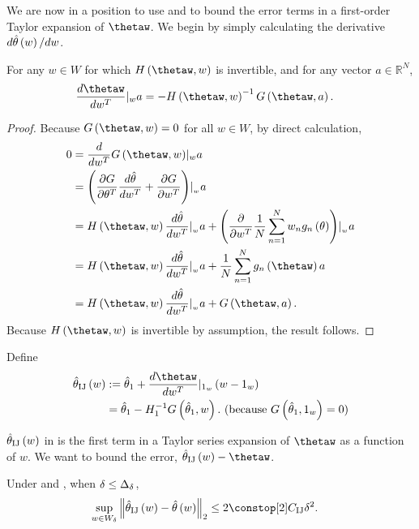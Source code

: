 We are now in a position to use \paperallcoreassum and 
to bound the error terms in a first-order Taylor expansion of $\thetaw$.
We begin by simply calculating the derivative $d\hat{\theta}\left(w\right)/dw$.
\begin{prop}
\label{propref:theta_w_first_derivative}For any $w\in W$ for which
$H\left(\thetaw,w\right)$ is invertible, and for any vector $a\in\mathbb{R}^{N}$,
\begin{align*}
\frac{d\thetaw}{dw^{T}}\at wa & =-H\left(\thetaw,w\right)^{-1}G\left(\thetaw,a\right).
\end{align*}
\end{prop}
\begin{proof}
Because $G\left(\thetaw,w\right)=0$ for all $w\in W$, by direct
calculation,
\begin{align*}
0 & =\frac{d}{dw^{T}}G\left(\thetaw,w\right)\at wa\\
 & =\left(\frac{\partial G}{\partial\theta^{T}}\frac{d\hat{\theta}}{dw^{T}}+\frac{\partial G}{\partial w^{T}}\right)\at{_{w}}a\\
 & =H\left(\thetaw,w\right)\frac{d\hat{\theta}}{dw^{T}}\at{_{w}}a+\left(\frac{\partial}{\partial w^{T}}\frac{1}{N}\sum_{n=1}^{N}w_{n}g_{n}\left(\theta\right)\right)\at{_{w}}a\\
 & =H\left(\thetaw,w\right)\frac{d\hat{\theta}}{dw^{T}}\at{_{w}}a+\frac{1}{N}\sum_{n=1}^{N}g_{n}\left(\thetaw\right)a\\
 & =H\left(\thetaw,w\right)\frac{d\hat{\theta}}{dw^{T}}\at{_{w}}a+G\left(\thetaw,a\right).
\end{align*}
Because $H\left(\thetaw,w\right)$ is invertible by assumption, the
result follows.
\end{proof}
\begin{defn}
\label{defref:theta_infinitesimal_jackknife}Define
\begin{align*}
\thetaij\left(w\right) & :=\thetaone+\frac{d\thetaw}{dw^{T}}\at{\onevec}\left(w-\onevec\right)\\
 & =\thetaone-\hone^{-1}G\left(\thetaone,w\right).\textrm{ (because }G\left(\thetaone,\onevec\right)=0\textrm{)}
\end{align*}
\end{defn}
%
$\hat{\theta}_{\textrm{IJ}}\left(w\right)$ in 
is the first term in a Taylor series expansion of $\thetaw$ as a
function of $w$. We want to bound the error, $\thetaij\left(w\right)-\thetaw$.
%
\begin{thm}
\label{thmref:taylor_error_first}

Under \paperallcoreassum and ,
when $\delta\le\Delta_{\delta}$,
%
\begin{align*}
\sup_{w\in W_{\delta}}\norm{\thetaij\left(w\right)-\thetahat\left(w\right)}_{2} & \le2\constop[2]\constij\delta^{2}.
\end{align*}
%
\end{thm}
